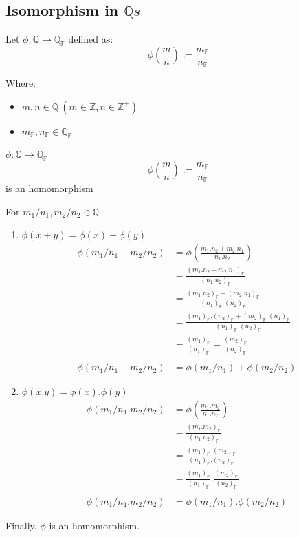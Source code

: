 \newpage
\subsection{Isomorphism in $\mathbb{Q}s$}
\begin{definition}
Let $\phi: \mathbb{Q} \rightarrow \mathbb{Q_F}$ defined as:
$$\phi(\frac{m}{n}) := \frac{m_\mathbb{F}}{n_\mathbb{F}}$$

Where:
\begin{itemize}
\item $m, n \in \mathbb{Q} \ (m \in \mathbb{Z}, n \in \mathbb{Z^+})$
\item $m_\mathbb{F}, n_\mathbb{F} \in \mathbb{Q_F}$
\end{itemize}
\end{definition}

\begin{lemma}\label{le:phi-homomorphism}
$\phi: \mathbb{Q} \rightarrow \mathbb{Q_F}$
$$\phi(\frac{m}{n}) := \frac{m_\mathbb{F}}{n_\mathbb{F}}$$ is an homomorphism
\end{lemma}

\begin{bookproof}
For $m_1/n_1, m_2/n_2 \in \mathbb{Q}$

\begin{enumerate}
\item $\phi(x + y) = \phi(x) + \phi(y)$
\begin{align*}
\phi(m_1/n_1 + m_2/n_2) &= \phi(\frac{m_1.n_2 + m_2.n_1}{n_1.n_2}) \\
&= \frac{(m_1.n_2 + m_2.n_1)_\mathbb{F}}{(n_1.n_2)_\mathbb{F}} \\ 
&= \frac{(m_1.n_2)_\mathbb{F} + (m_2.n_1)_\mathbb{F}}{(n_1)_\mathbb{F}.(n_2)_\mathbb{F}} \\
&= \frac{(m_1)_\mathbb{F}.(n_2)_\mathbb{F} + (m_2)_\mathbb{F}.(n_1)_\mathbb{F}}{(n_1)_\mathbb{F}.(n_2)_\mathbb{F}} \\
&= \frac{(m_1)_\mathbb{F}}{(n_1)_\mathbb{F}} + \frac{(m_2)_\mathbb{F}}{(n_2)_\mathbb{F}} \\\\
\phi(m_1/n_1 + m_2/n_2) &= \phi(m_1/n_1) + \phi(m_2/n_2)
\end{align*}

\item $\phi(x.y) = \phi(x) . \phi(y)$
\begin{align*}
\phi(m_1/n_1 . m_2/n_2) &= \phi(\frac{m_1.m_2}{n_1.n_2}) \\
&= \frac{(m_1.m_2)_\mathbb{F}}{(n_1.n_2)_\mathbb{F}} \\
&= \frac{(m_1)_\mathbb{F}.(m_2)_\mathbb{F}}{(n_1)_\mathbb{F}.(n_2)_\mathbb{F}} \\
&= \frac{(m_1)_\mathbb{F}}{(n_1)_\mathbb{F}} . \frac{(m_2)_\mathbb{F}}{(n_2)_\mathbb{F}} \\\\
\phi(m_1/n_1 . m_2/n_2) &= \phi(m_1/n_1) . \phi(m_2/n_2)
\end{align*}
\end{enumerate}

Finally, $\phi$ is an homomorphism.
\end{bookproof}

